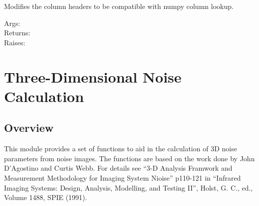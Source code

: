 \documentclass[a4paper,10pt,english]{sphinxmanual}
\begin{document}
\begin{fulllineitems}
\label{rymodtran:pyradi.rymodtran.fixHeadersList}
Modifies the column headers to be compatible with numpy column lookup.
\begin{description}
\item[{Args:}] \leavevmode
{}

\item[{Returns:}] \leavevmode
{}

\item[{Raises:}] \leavevmode
{}

\end{description}

\end{fulllineitems}



\chapter{Three-Dimensional Noise Calculation}
\label{ry3dnoise:three-dimensional-noise-calculation}\label{ry3dnoise::doc}

\section{Overview}
\label{ry3dnoise:overview}\label{ry3dnoise:module-pyradi.ry3dnoise}
This module provides a set of functions to aid in the calculation of 3D noise parameters from
noise images. The functions are based on the work done by John D'Agostino and Curtis Webb.
For details see ``3-D Analysis Framwork and Measurement Methodology for Imaging System
Nioise'' p110-121 in ``Infrared Imaging Systems: Design, Analysis, Modelling, and Testing II'',
Holst, G. C., ed., Volume 1488, SPIE (1991).
\end{document}
